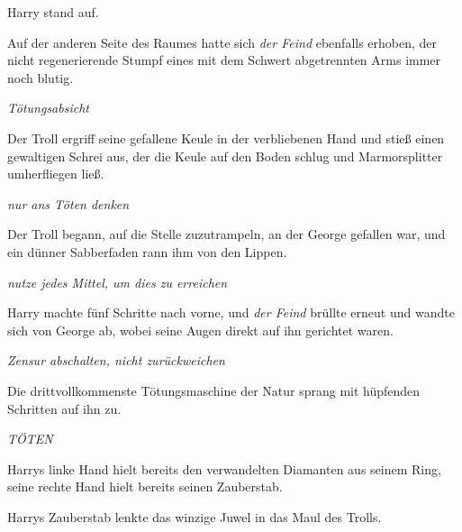 Harry stand auf.

Auf der anderen Seite des Raumes hatte sich \emph{der Feind} ebenfalls erhoben, der nicht regenerierende Stumpf eines mit dem Schwert abgetrennten Arms immer noch blutig.

\emph{Tötungsabsicht}

Der Troll ergriff seine gefallene Keule in der verbliebenen Hand und stieß einen gewaltigen Schrei aus, der die Keule auf den Boden schlug und Marmorsplitter umherfliegen ließ.

\emph{nur ans Töten denken}

Der Troll begann, auf die Stelle zuzutrampeln, an der George gefallen war, und ein dünner Sabberfaden rann ihm von den Lippen.

\emph{nutze jedes Mittel, um dies zu erreichen}

Harry machte fünf Schritte nach vorne, und \emph{der Feind} brüllte erneut und wandte sich von George ab, wobei seine Augen direkt auf ihn gerichtet waren.

\emph{Zensur abschalten, nicht zurückweichen}

Die drittvollkommenste Tötungsmaschine der Natur sprang mit hüpfenden Schritten auf ihn zu.

\emph{TÖTEN}

Harrys linke Hand hielt bereits den verwandelten Diamanten aus seinem Ring, seine rechte Hand hielt bereits seinen Zauberstab.


Harrys Zauberstab lenkte das winzige Juwel in das Maul des Trolls.

